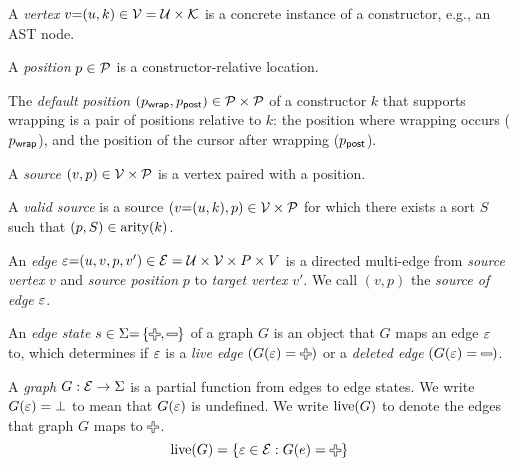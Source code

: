 \begin{definition}
  A \emph{vertex} $v{=}(u, k) \in \V = \U \times \K$ is a concrete instance of a constructor, e.g., an AST node.
\end{definition}

\begin{definition}
  A \emph{position} $p \in \P$ is a constructor-relative location.
\end{definition}

\begin{definition}
  The \emph{default position} $(\pWrap, \pPost) \in \P \times \P$ of a constructor $k$
  that supports wrapping is a pair of positions relative to $k$:
  the position where wrapping occurs ($\pWrap$),
  and the position of the cursor after wrapping ($\pPost$).
\end{definition}

\begin{definition}
  A \emph{source} $(v, p) \in \V \times \P$ is a vertex paired with a position.
\end{definition}

\begin{definition}
  A \emph{valid source} is a source $(v{=}(u, k), p) \in \V \times \P$
  for which there exists a sort $S$ such that $(p, S) \in \arity{k}$.
\end{definition}

\begin{definition}
  An \emph{edge} $\e{=}(u, v, p, v^\prime) \in \E = \U \times \V \times P \times V$
  is a directed multi-edge from \emph{source vertex} $v$ and \emph{source position} $p$ to \emph{target vertex} $v'$.
  We call $(v, p)$ the \emph{source of edge} $\e$.
\end{definition}

\begin{definition}
  An \emph{edge state} $s \in \Sigma{=}\SetOf{\Plus, \Minus}$ of a graph $G$ is an object that $G$ maps an edge $\e$ to,
  which determines if $\e$ is a \emph{live edge} $\left(G(\e) = \Plus\right)$ or a \emph{deleted edge} $\left(G(\e) = \Minus\right)$.
\end{definition}

\begin{definition}
  A \emph{graph} $G : \E \rightarrow \Sigma$ is a partial function from edges to edge states.
  We write $G(\e) = \bot$ to mean that $G(\e)$ is undefined.
  We write $\live{G}$ to denote the edges that graph $G$ maps to $\Plus$.
  \[
    \live{G} = \SetOf{\e \in \E \SuchThat{G(e) = \Plus}}
  \]
\end{definition}

